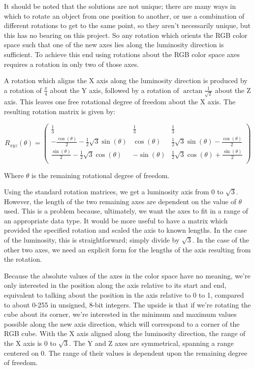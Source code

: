 \documentclass[10pt,a4paper]{article}
\begin{document}
It should be noted that the solutions are not unique; there are many ways in which to rotate an object from one position to another, or use a combination of different rotations to get to the same point, so they aren't necessarily unique, but this has no bearing on this project. So any rotation which orients the RGB color space such that one of the new axes lies along the luminosity direction is sufficient. To achieve this end using rotations about the RGB color space axes requires a rotation in only two of those axes.

A rotation which aligns the X axis along the luminosity direction is produced by a rotation of $\frac{\pi}4$ about the Y axis, followed by a rotation of $\arctan{\frac{1}{\sqrt{2}}}$ about the Z axis. This leaves one free rotational degree of freedom about the X axis. The resulting rotation matrix is given by:

\begin{equation}
R_{xyz}(\theta) =
\left(
\begin{array}{ccc}
 \frac{1}{3} & \frac{1}{3} & \frac{1}{3} \\
 -\frac{\cos (\theta )}{2}-\frac{1}{2} \sqrt{3} \sin (\theta ) & \cos (\theta ) & \frac{1}{2} \sqrt{3} \sin (\theta )-\frac{\cos (\theta )}{2} \\
 \frac{\sin (\theta )}{2}-\frac{1}{2} \sqrt{3} \cos (\theta ) & -\sin (\theta ) & \frac{1}{2} \sqrt{3} \cos (\theta )+\frac{\sin (\theta )}{2} \\
\end{array}
\right)
\end{equation}


Where $\theta$ is the remaining rotational degree of freedom.

Using the standard rotation matrices, we get a luminosity axis from 0 to $\sqrt{3}$. However, the length of the two remaining axes are dependent on the value of $\theta$ used. This is a problem because, ultimately, we want the axes to fit in a range of an appropriate data type. It would be more useful to have a matrix which provided the specified rotation and scaled the axis to known lengths. In the case of the luminosity, this is straightforward; simply divide by $\sqrt{3}$. In the case of the other two axes, we need an explicit form for the lengths of the axis resulting from the rotation.

Because the absolute values of the axes in the color space have no meaning, we're only interested in the position along the axis relative to its start and end, equivalent to talking about the position in the axis relative to 0 to 1, compared to about 0-255 in unsigned, 8-bit integers. The upside is that if we're rotating the cube about its corner, we're interested in the minimum and maximum values possible along the new axis direction, which will correspond to a corner of the RGB cube. With the X axis aligned along the luminosity direction, the range of the X axis is 0 to $\sqrt{3}$. The Y and Z axes are symmetrical, spanning a range centered on 0. The range of their values is dependent upon the remaining degree of freedom.
\end{document}
